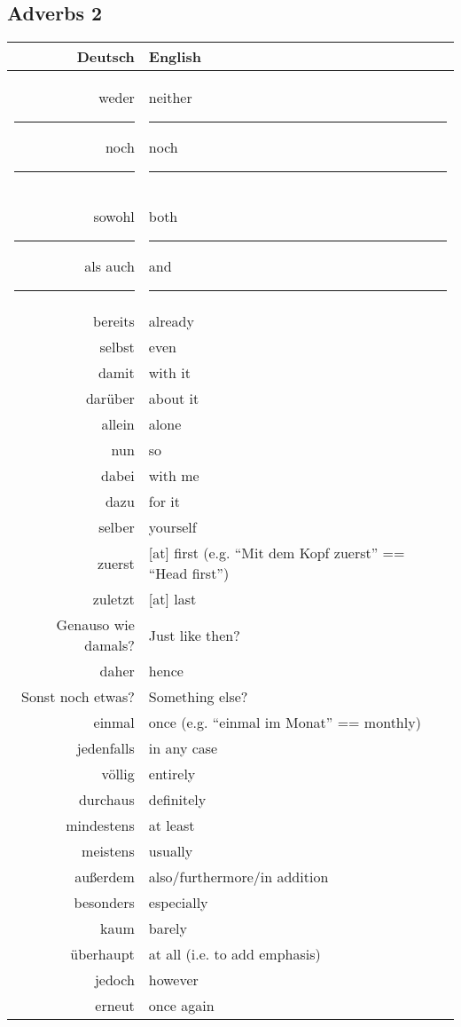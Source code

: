 \subsection{Adverbs 2}

\begin{center}\begin{tabular}{r|l}
  \textbf{Deutsch} & \textbf{English} \\
	\hline
	weder \rule{1cm}{0.4pt} noch \rule{1cm}{0.4pt} & neither \rule{1cm}{0.4pt} noch \rule{1cm}{0.4pt} \\
	sowohl \rule{1cm}{0.4pt} als auch \rule{1cm}{0.4pt}& both \rule{1cm}{0.4pt} and \rule{1cm}{0.4pt} \\
	bereits & already \\
	selbst & even \\
	damit & with it \\
	dar{\"u}ber & about it \\
	allein & alone \\
	nun & so \\
	dabei & with me \\
	dazu & for it \\
	selber & yourself \\
	zuerst & [at] first (e.g. ``Mit dem Kopf zuerst'' == ``Head first'') \\
	zuletzt & [at] last \\
	Genauso wie damals? & Just like then? \\
	daher & hence \\
	Sonst noch etwas? & Something else? \\
	einmal & once (e.g. ``einmal im Monat'' == monthly) \\
	jedenfalls & in any case \\
	v{\"o}llig & entirely \\
	durchaus & definitely \\
	mindestens & at least \\
	meistens & usually \\
	au{\ss}erdem & also/furthermore/in addition \\
	besonders & especially \\
	kaum & barely \\
	{\"u}berhaupt & at all (i.e. to add emphasis) \\
	jedoch & however \\
	erneut & once again \\
\end{tabular}\end{center}


